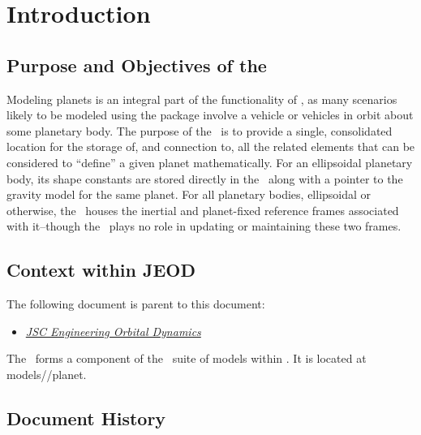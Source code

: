 \setcounter{chapter}{0}

\chapter{Introduction}\label{ch:intro}

\section{Purpose and Objectives of the \planetDesc}

Modeling planets is an integral part of the functionality of \JEODid, as
many scenarios likely to be modeled using the package involve
a vehicle or vehicles in orbit about some planetary body. The purpose of
the \planetDesc\ is to provide a single, consolidated location for the
storage of, and connection to, all the related elements that can be
considered to ``define'' a given planet mathematically.
For an ellipsoidal planetary body, its shape constants are stored directly
in the \planetDesc\, along with a pointer to the gravity model for the
same planet.  For all planetary bodies, ellipsoidal or otherwise,
the \planetDesc\ houses the inertial and planet-fixed reference frames
associated with it--though the \planetDesc\ plays no role in updating
or maintaining these two frames.


\section{Context within JEOD}
The following document is parent to this document:
\begin{itemize}
\item{\href{file:\JEODHOME/docs/JEOD.pdf}
           {\em JSC Engineering Orbital Dynamics}}
                          \cite{dynenv:JEOD}
\end{itemize}

The \planetDesc\ forms a component of the \ModelClass\ suite of
models within \JEODid. It is located at
models/\ModelClass/planet.


\section{Document History}


